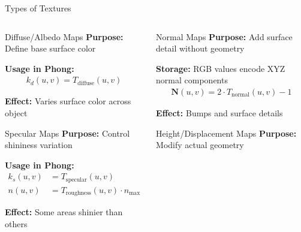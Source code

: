 \begin{frame}{Types of Textures}
  \footnotesize
  \begin{columns}
    \begin{column}{0.5\textwidth}
      \begin{conceptbox}{Diffuse/Albedo Maps}
        \footnotesize
        \textbf{Purpose:} Define base surface color

        \textbf{Usage in Phong:}
        \begin{align*}
          k_d(u,v) = T_{\text{diffuse}}(u,v)
        \end{align*}

        \textbf{Effect:} Varies surface color across object
      \end{conceptbox}

      \vspace{0.3cm}
      \begin{conceptbox}{Specular Maps}
        \footnotesize
        \textbf{Purpose:} Control shininess variation

        \textbf{Usage in Phong:}
        \begin{align*}
          k_s(u,v) &= T_{\text{specular}}(u,v) \\
          n(u,v) &= T_{\text{roughness}}(u,v) \cdot n_{\max}
        \end{align*}

        \textbf{Effect:} Some areas shinier than others
      \end{conceptbox}
    \end{column}
    \begin{column}{0.5\textwidth}
      \begin{conceptbox}{Normal Maps}
        \footnotesize
        \textbf{Purpose:} Add surface detail without geometry

        \textbf{Storage:} RGB values encode XYZ normal components
        \begin{align*}
          \mathbf{N}(u,v) = 2 \cdot T_{\text{normal}}(u,v) - 1
        \end{align*}

        \textbf{Effect:} Bumps and surface details
      \end{conceptbox}

      \vspace{0.3cm}
      \begin{conceptbox}{Height/Displacement Maps}
        \footnotesize
        \textbf{Purpose:} Modify actual geometry


\end{conceptbox}
\end{column}
\end{columns}
\end{frame}
